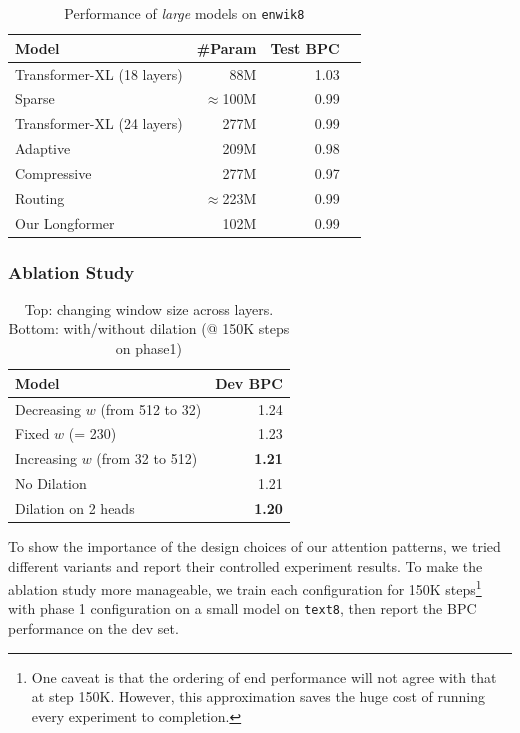 \documentclass[11pt,a4paper]{article}
\newcommand{\model}{Longformer\xspace}
\begin{document}
\begin{table}[t]
    \centering
    \small
    \begin{tabular}{@{}lrrr@{}}
    \toprule
    Model & \#Param & Test BPC \\
    \midrule
    Transformer-XL (18 layers)           & 88M  &  1.03 \\
    Sparse~\cite{sparseOpenai}                  &$\approx$100M &  0.99 \\
    Transformer-XL (24 layers)           & 277M &  0.99 \\
    Adaptive~\cite{adaptivespan}                        & 209M &  0.98 \\
    Compressive~\cite{compressive}              & 277M &  0.97 \\
    Routing~\cite{roy2020efficient} & $\approx$223M & 0.99 \\
    Our \model                           & 102M &  0.99 \\
    \bottomrule
    \end{tabular}
    \caption{Performance of \emph{large} models on \texttt{enwik8}}
    \label{tab:charlm-large}
\end{table}

\subsubsection{Ablation Study}

\begin{table}[t]
    \centering
    \small
    \begin{tabular}{@{}lr@{}}
    \toprule
    Model & Dev BPC \\
    \midrule
    Decreasing $w$ (from 512 to 32) & 1.24 \\
    Fixed $w$ (= 230) &  1.23 \\
    Increasing $w$ (from 32 to 512) &\textbf{ 1.21} \\
    \midrule
    No Dilation &  1.21 \\
    Dilation on 2 heads &  \textbf{1.20} \\
    \bottomrule
    \end{tabular}
    \caption{Top: changing window size
    across layers. Bottom: with/without dilation (@ 150K steps on phase1)}
    \label{tab:ablation_charlm}
\end{table}

To show the importance of the design choices of our attention patterns, we tried different variants and report their controlled experiment results. 
To make the ablation study more manageable, we train each configuration for 150K steps\footnote{
One caveat is that the ordering of end performance will not agree with that at step 150K.
However, this approximation saves the huge cost of running every experiment to completion.}
with phase 1 configuration on a small model on \texttt{text8}, then report the BPC performance on the dev set. 
\end{document}
